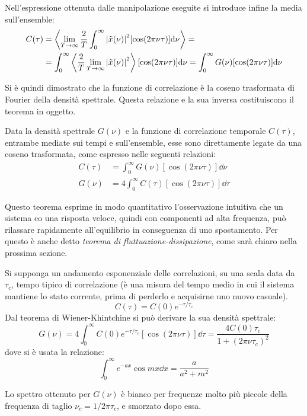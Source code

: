 Nell'espressione ottenuta dalle manipolazione eseguite si introduce infine la media sull'ensemble:
\begin{align*}
C(\tau) &= \expval{\lim\limits_{T \rightarrow \infty} \frac{2}{T} \int_{0}^{\infty} \abs{\tilde{x}(\nu)}^2 [\cos( 2\pi \nu \tau)] \dd \nu  } =\\
&= \int_{0}^{\infty}  \expval{\frac{2}{T} \lim\limits_{T \rightarrow \infty} \abs{\tilde{x}(\nu)}^2} [\cos( 2\pi \nu \tau)] \dd \nu = \int_{0}^{\infty}  G(\nu) [\cos( 2\pi \nu \tau)] \dd \nu
\end{align*}

Si è quindi dimostrato che la funzione di correlazione è la coseno trasformata di Fourier della densità spettrale. Questa relazione e la sua inversa costituiscono il teorema in oggetto.

\begin{thm}
	Data la densità spettrale $ G(\nu) $ e la funzione di correlazione temporale $ C(\tau) $, entrambe mediate sui tempi e sull'ensemble, esse sono direttamente legate da una coseno trasformata, come espresso nelle seguenti relazioni:
	\begin{align*}
		C(\tau) &= \int_{0}^{\infty} G(\nu) [\cos( 2\pi \nu \tau)] \dd \nu\\
		G(\nu) &= 4 \int_{0}^{\infty} C(\tau) [\cos( 2\pi \nu \tau)] \dd \tau
	\end{align*}
\end{thm}

Questo teorema esprime in modo quantitativo l'osservazione intuitiva che un sistema co una risposta veloce, quindi con componenti ad alta frequenza, può rilassare rapidamente all'equilibrio in conseguenza di uno spostamento. Per questo è anche detto \textit{teorema di fluttuazione-dissipazione}, come sarà chiaro nella prossima sezione.

\begin{es}
	\label{es:expcorr}
	Si supponga un andamento esponenziale delle correlazioni, su una scala data da $ \tau_c $, tempo tipico di correlazione (è una misura del tempo medio in cui il sistema mantiene lo stato corrente, prima di perderlo e acquisirne uno nuovo casuale).
	\[ C(\tau) = C(0) e^{-\tau/\tau_c} \]
	Dal teorema di Wiener-Khintchine si può derivare la sua densità spettrale:
	\[ G(\nu) = 4 \int_{0}^{\infty} C(0) e^{-\tau/\tau_c} [\cos( 2\pi \nu \tau)] \dd \tau = \frac{4 C(0) \tau_c}{1 + (2\pi \nu \tau_c)^2} \]
	dove si è usata la relazione:
	\[ \int_0^\infty e^{-ax} \cos mx \dd x = \frac{a}{a^2 + m^2} \]
	
	Lo spettro ottenuto per $ G(\nu) $ è bianco per frequenze molto più piccole della frequenza di taglio $ \nu_c = 1/2\pi\tau_c$, e smorzato dopo essa.
\end{es}

